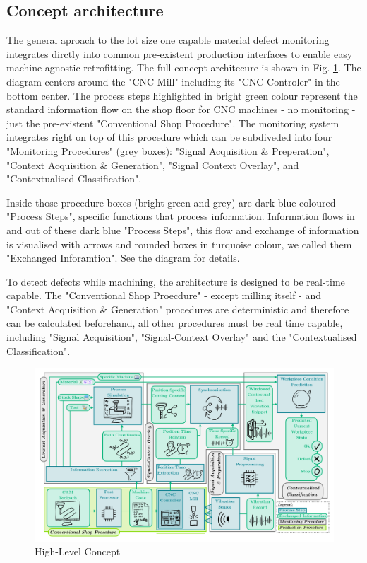 \documentclass[5p,times,procedia]{elsarticle}
\begin{document}
\subsection{Concept architecture}\label{Sec_ConceptArchitecture}
\vspace*{-\baselineskip}
The general aproach to the lot size one capable material defect monitoring integrates dirctly into common pre-existent production interfaces to enable easy machine agnostic retrofitting. The full concept architecure is shown in Fig. \ref{Fig_ConceptDiagram}.
The diagram centers around the "CNC Mill" including its "CNC Controler" in the bottom center. The process steps highlighted in bright green colour represent the standard information flow on the shop floor for CNC machines - no monitoring -just the pre-existent "Conventional Shop Procedure".
The monitoring system integrates right on top of this procedure which can be subdiveded into four "Monitoring Procedures" (grey boxes): "Signal Acquisition \& Preperation", "Context Acquisition \& Generation", "Signal Context Overlay", and "Contextualised Classification".

Inside those procedure boxes (bright green and grey) are dark blue coloured "Process Steps", specific functions that process information. Information flows in and out of these dark blue "Process Steps", this flow and exchange of information is visualised with arrows and rounded boxes in turquoise colour, we called them "Exchanged Inforamtion".
See the diagram for details.

To detect defects while machining, the architecture is designed to be real-time capable. The "Conventional Shop Proecdure" - except milling itself - and "Context Acquisition \& Generation" procedures are deterministic and therefore can be calculated beforehand, all other procedures must be real time capable, including "Signal Acquisition", "Signal-Context Overlay" and the "Contextualised Classification".

\begin{figure}[t]
    \centering
    \includegraphics[width=0.99\linewidth]{ConceptDiagram.pdf}
    \caption{High-Level Concept}
    \label{Fig_ConceptDiagram}
\end{figure}
 
\end{document}
